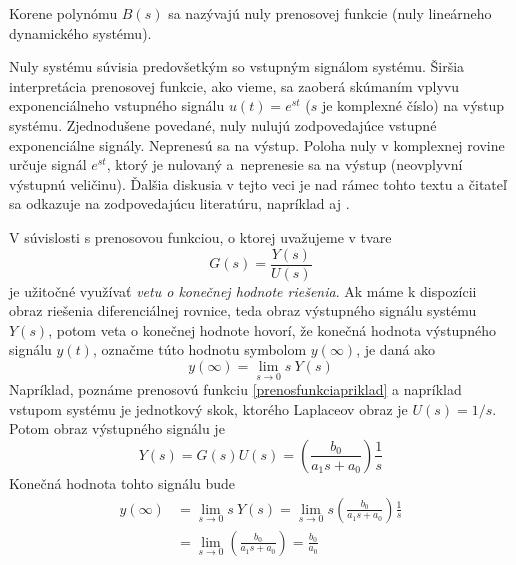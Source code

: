 \documentclass[a4paper, 10pt, ]{article}
\begin{document}
Korene polynómu $B(s)$ sa nazývajú nuly prenosovej funkcie (nuly lineárneho dynamického systému).

Nuly systému súvisia predovšetkým so vstupným signálom systému. Širšia interpretácia prenosovej funkcie, ako vieme, sa zaoberá skúmaním vplyvu exponenciálneho vstupného signálu $u(t) = e^{st}$ ($s$ je komplexné číslo) na výstup systému. Zjednodušene povedané, nuly nulujú zodpovedajúce vstupné exponenciálne signály. Neprenesú sa na výstup. Poloha nuly v komplexnej rovine určuje signál $e^{st}$, ktorý je nulovaný a~neprenesie sa na výstup (neovplyvní výstupnú veličinu). Ďalšia diskusia v tejto veci je nad rámec tohto textu a čitateľ sa odkazuje na zodpovedajúcu literatúru, napríklad aj \cite{Aastroem2020}.

V súvislosti s prenosovou funkciou, o ktorej uvažujeme v tvare
\begin{equation}
    G(s) = \frac{Y(s)}{U(s)}
\end{equation}
je užitočné využívať \emph{vetu o konečnej hodnote riešenia}. Ak máme k dispozícii obraz riešenia diferenciálnej rovnice, teda obraz výstupného signálu systému $Y(s)$, potom veta o konečnej hodnote hovorí, že konečná hodnota výstupného signálu $y(t)$, označme túto hodnotu symbolom $y(\infty)$, je daná ako
\begin{equation}
    y(\infty) = \lim_{s \to 0} s\ Y(s)   
\end{equation}
Napríklad, poznáme prenosovú funkciu \eqref{prenosfunkciapriklad} a napríklad vstupom systému je jednotkový skok, ktorého Laplaceov obraz je $U(s) = 1/s$. Potom obraz výstupného signálu je
\begin{equation}
    Y(s) = G(s) U(s) = \left( \frac{b_0}{a_1 s + a_0} \right) \frac{1}{s}  
\end{equation}
Konečná hodnota tohto signálu bude
\begin{subequations}
    \begin{align}
        y(\infty) &= \lim_{s \to 0} s\ Y(s) = \lim_{s \to 0} s \left( \frac{b_0}{a_1 s + a_0} \right) \frac{1}{s} 
        \\
        &= \lim_{s \to 0} \left( \frac{b_0}{a_1 s + a_0} \right) = \frac{b_0}{a_0}        
    \end{align}
\end{subequations}







\printbibliography[title={Referencie a ďalšia literatúra}]
\end{document}
